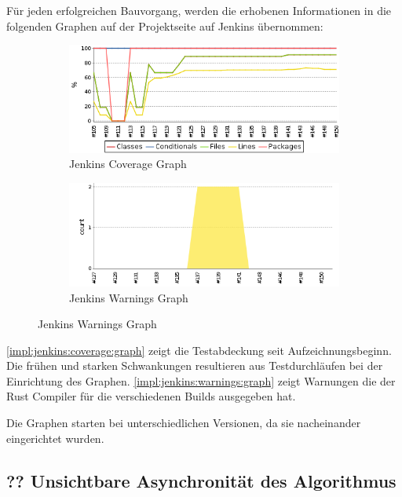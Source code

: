 Für jeden erfolgreichen Bauvorgang, werden die erhobenen Informationen in die folgenden Graphen auf der Projektseite auf Jenkins übernommen:

\begin{figure}[H]
	\centering
	\begin{subfigure}{.5\textwidth}
		\includegraphics[width=\textwidth]{images/jenkins_coverage_graph.png}
		\caption{Jenkins Coverage Graph}
		\label{impl:jenkins:coverage:graph}
	\end{subfigure}%
	\begin{subfigure}{.5\textwidth}
		\includegraphics[width=\textwidth]{images/jenkins_warnings_graph.png}
		\caption{Jenkins Warnings Graph}
		\label{impl:jenkins:warnings:graph}
	\end{subfigure}
\end{figure}

\autoref{impl:jenkins:coverage:graph} zeigt die Testabdeckung seit Aufzeichnungsbeginn.
Die frühen und starken Schwankungen resultieren aus Testdurchläufen bei der Einrichtung des Graphen.
\autoref{impl:jenkins:warnings:graph} zeigt Warnungen die der Rust Compiler für die verschiedenen Builds ausgegeben hat.

Die Graphen starten bei unterschiedlichen Versionen, da sie nacheinander eingerichtet wurden.


\subsection{?? Unsichtbare Asynchronität des Algorithmus}

